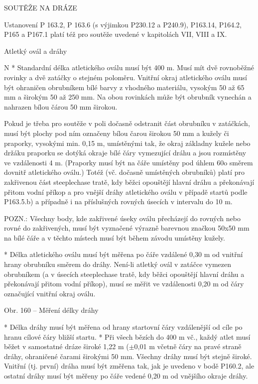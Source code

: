 \sec SOUTĚŽE NA DRÁZE

Ustanovení P 163.2, P 163.6 (s výjimkou P230.12 a P240.9), P163.14, P164.2, P165 a P167.1 platí též pro soutěže uvedené v kapitolách VII, VIII a IX.

\secc Atletký ovál a dráhy

\begitems \style N
* Standardní délka atletického oválu musí být 400 m. Musí mít dvě rovnoběžné rovinky a dvě zatáčky o stejném poloměru. Vnitřní okraj atletického oválu musí být ohraničen obrubníkem bílé barvy z vhodného materiálu, vysokým 50 až 65 mm a širokým 50 až 250 mm. Na obou rovinkách může být obrubník vynechán a nahrazen bílou čárou 50 mm širokou.

Pokud je třeba pro soutěže v poli dočasně odstranit část obrubníku v zatáčkách, musí být plochy pod ním označeny bílou čarou širokou 50 mm a kužely či praporky, vysokými min. 0,15 m, umístěnými tak, že okraj základny kužele nebo držáku praporku se dotýká okraje bílé čáry vymezující dráhu a jsou rozmístěny ve vzdálenosti 4 m. (Praporky musí být na čáře umístěny pod úhlem 60o směrem dovnitř atletického oválu.) Totéž (vč. dočasně umístěných obrubníků) platí pro zakřivenou část steeplechase tratě, kdy běžci opouštějí hlavní dráhu a překonávají přitom vodní příkop a pro vnější dráhy atletického oválu v případě startů podle P163.5.b) a případně i na příslušných rovných úsecích v intervalu do 10 m.

POZN.: Všechny body, kde zakřivené úseky oválu přecházejí do rovných nebo rovné do zakřivených, musí být vyznačené výrazně barevnou značkou 50x50 mm na bílé čáře a v těchto místech musí být během závodu umístěny kužely.

* Délka atletického oválu musí být měřena po čáře vzdálené 0,30 m od vnitřní hrany obrubníku směrem do dráhy. Není-li atletký ovál v zatáčce vymezen obrubníkem (a v úsecích steeplechase tratě, kdy běžci opouštějí hlavní dráhu a překonávají přitom vodní příkop), musí se měřit ve vzdálenosti 0,20 m od čáry označující vnitřní okraj oválu.

Obr. 160 -- Měření délky dráhy

* Délka dráhy musí být měřena od hrany startovní čáry vzdálenější od cíle po hranu cílové čáry bližší startu.
* Při všech bězích do 400 m vč., každý atlet musí běžet v samostatné dráze široké 1,22 m ($\pm$0,01 m včetně čáry na pravé straně dráhy, ohraničené čarami širokými 50 mm. Všechny dráhy musí být stejně široké. Vnitřní (tj. první) dráha musí být změřena tak, jak je uvedeno v bodě P160.2, ale ostatní dráhy musí být měřeny po čáře vedené 0,20 m od vnějšího okraje dráhy.

